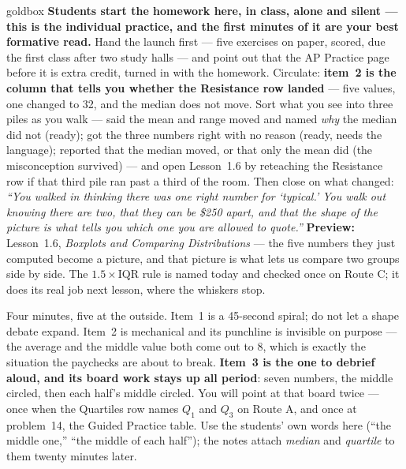 \documentclass[10pt]{article}
\begin{document}
\boxguard
\begin{skillbox}{goldbox}
\textbf{Students start the homework here, in class, alone and silent --- this is the individual
practice, and the first minutes of it are your best formative read.} Hand the launch first ---
five exercises on paper, scored, due the first class after two study halls --- and point
out that the AP Practice page before it is extra credit, turned in with the homework. Circulate:
\textbf{item~2 is the column that tells you whether the Resistance row landed} --- five values, one
changed to 32, and the median does not move. Sort what you see into three piles as you walk
--- said the mean and range moved and named \emph{why} the median did not (ready); got the three
numbers right with no reason (ready, needs the language); reported that the median moved, or
that only the mean did (the misconception survived) --- and open Lesson~1.6 by reteaching the
Resistance row if that third pile ran past a third of the room. Then close on what
changed: \emph{``You walked in thinking there was one right number for `typical.' You walk out
knowing there are two, that they can be \$250 apart, and that the shape of the picture is what
tells you which one you are allowed to quote.''} \textbf{Preview:} Lesson~1.6, \emph{Boxplots
and Comparing Distributions} --- the five numbers they just computed become a picture, and that
picture is what lets us compare two groups side by side. The $1.5\times\text{IQR}$ rule is named
today and checked once on Route C; it does its real job next lesson, where the whiskers stop.
\end{skillbox}

\begin{teachernote}[Warm-Up]
Four minutes, five at the outside. Item~1 is a 45-second spiral; do not let a shape debate
expand. Item~2 is mechanical and its punchline is invisible on purpose --- the average and the
middle value both come out to 8, which is exactly the situation the paychecks are about to
break. \textbf{Item~3 is the one to debrief aloud, and its board work stays up all period}:
seven numbers, the middle circled, then each half's middle circled. You will point at that board
twice --- once when the Quartiles row names $Q_1$ and $Q_3$ on Route A, and once at problem~14,
the Guided Practice table. Use the students' own words here (``the middle one,'' ``the middle of each
half''); the notes attach \emph{median} and \emph{quartile} to them twenty minutes later.
\end{teachernote}
\end{document}
